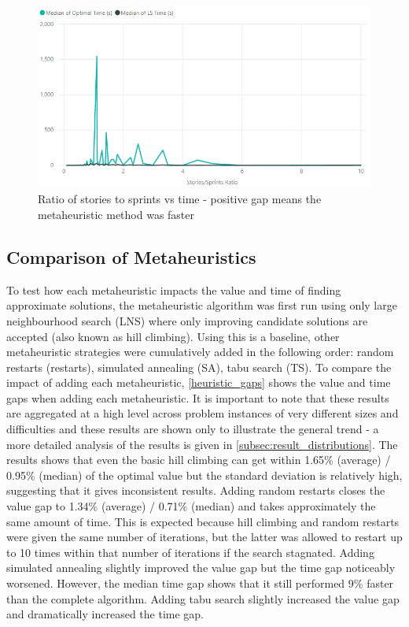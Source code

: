 \begin{figure}[h!]
    \centering
    \includegraphics[width=\textwidth]{Figures/FinalResults/annealing_time_stories_sprints.png}
     \caption{Ratio of stories to sprints vs time - positive gap means the metaheuristic method was faster}
     \label{fig:time_vs_stories_sprints}
\end{figure}

\FloatBarrier

\subsection{Comparison of Metaheuristics}

To test how each metaheuristic impacts the value and time of finding approximate solutions, the metaheuristic algorithm was first run using only large neighbourhood search (LNS) where only improving candidate solutions are accepted (also known as hill climbing). Using this is a baseline, other metaheuristic strategies were cumulatively added in the following order: random restarts (restarts), simulated annealing (SA), tabu search (TS). To compare the impact of adding each metaheuristic, \cref{heuristic_gaps} shows the value and time gaps when adding each metaheuristic. It is important to note that these results are aggregated at a high level across problem instances of very different sizes and difficulties and these results are shown only to illustrate the general trend - a more detailed analysis of the results is given in \cref{subsec:result_distributions}. The results shows that even the basic hill climbing can get within 1.65\% (average) / 0.95\% (median) of the optimal value but the standard deviation is relatively high, suggesting that it gives inconsistent results. Adding random restarts closes the value gap to 1.34\% (average) / 0.71\% (median) and takes approximately the same amount of time. This is expected because hill climbing and random restarts were given the same number of iterations, but the latter was allowed to restart up to 10 times within that number of iterations if the search stagnated. Adding simulated annealing slightly improved the value gap but the time gap noticeably worsened. However, the median time gap shows that it still performed 9\% faster than the complete algorithm. Adding tabu search slightly increased the value gap and dramatically increased the time gap.

